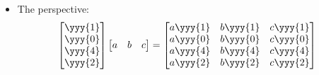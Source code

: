 \begin{itemize}
\begin{itemize}
\begin{itemize}
      \item The  perspective:
      \[%
      \begin{bmatrix}
        \yyy{1} \\
        \yyy{0} \\
        \yyy{4} \\
        \yyy{2}
      \end{bmatrix} \begin{bmatrix} a & b & c \end{bmatrix}
      =
      \begin{bmatrix}
        a\yyy{1} & b\yyy{1} & c\yyy{1} \\
        a\yyy{0} & b\yyy{0} & c\yyy{0} \\
        a\yyy{4} & b\yyy{4} & c\yyy{4} \\
        a\yyy{2} & b\yyy{2} & c\yyy{2}  
      \end{bmatrix}
      \]%
    \end{itemize}
  \end{itemize}
  

\end{itemize}
